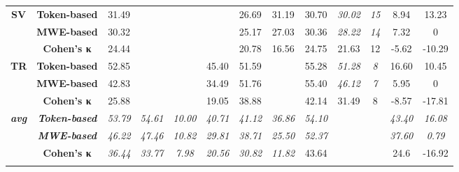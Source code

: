 \documentclass[output=paper,modfonts,nonflat,draftmode]{langsci/langscibook}
\begin{document}
\begin{table}
{\begin{tabular}{ccccccccccccc}
\textbf{\scriptsize{}SV} & \textbf{\scriptsize{}Token-based} & {\scriptsize{}31.49} &  &  &  & {\scriptsize{}26.69} & {\scriptsize{}31.19} & {\scriptsize{}30.70} & \emph{\scriptsize{}30.02} & \textit{\scriptsize{}15} & {\scriptsize{}8.94} & {\scriptsize{}13.23}\tabularnewline
 & \textbf{\scriptsize{}MWE-based} & {\scriptsize{}30.32} &  &  &  & {\scriptsize{}25.17} & {\scriptsize{}27.03} & {\scriptsize{}30.36} & \emph{\scriptsize{}28.22} & \textit{\scriptsize{}14} & {\scriptsize{}7.32} & {\scriptsize{}0}\tabularnewline
   & \textbf{\scriptsize{}Cohen's κ} &\scriptsize{24.44}  &\scriptsize{}  &\scriptsize{}  & \scriptsize{} &\scriptsize{20.78}  &\scriptsize{16.56}  &\scriptsize{24.75} &\scriptsize{21.63}  &\scriptsize{12} & \scriptsize{-5.62} &\scriptsize{-10.29}  \tabularnewline
\midrule 

\textbf{\scriptsize{}TR} & \textbf{\scriptsize{}Token-based} & {\scriptsize{}52.85} &  &  & {\scriptsize{}45.40} & {\scriptsize{}51.59} &  & {\scriptsize{}55.28} & \emph{\scriptsize{}51.28} & \textit{\scriptsize{}8} & {\scriptsize{}16.60} & {\scriptsize{}10.45}\tabularnewline
 & \textbf{\scriptsize{}MWE-based} & {\scriptsize{}42.83} &  &  & {\scriptsize{}34.49} & {\scriptsize{}51.76} &  & {\scriptsize{}55.40} & \emph{\scriptsize{}46.12} & \textit{\scriptsize{}7} & {\scriptsize{}5.95} & {\scriptsize{}0}\tabularnewline
   & \textbf{\scriptsize{}Cohen's κ} &\scriptsize{25.88}  &\scriptsize{}  &\scriptsize{}  & \scriptsize{19.05} &\scriptsize{38.88}  &\scriptsize{}  &\scriptsize{42.14} &\scriptsize{31.49}  &\scriptsize{8} & \scriptsize{-8.57}&\scriptsize{-17.81}  \tabularnewline
\midrule 

\textbf{\emph{\scriptsize{}avg}} & \textbf{\emph{\scriptsize{}Token-based}} & \emph{\scriptsize{}53.79} & \emph{\scriptsize{}54.61} & \emph{\scriptsize{}10.00} & \emph{\scriptsize{}40.71} & \emph{\scriptsize{}41.12} & \emph{\scriptsize{}36.86} & \emph{\scriptsize{}54.10} &  &  & \textit{\scriptsize{}43.40} & \textit{\scriptsize{}16.08}\tabularnewline
 & \textbf{\emph{\scriptsize{}MWE-based}} & \emph{\scriptsize{}46.22} & \emph{\scriptsize{}47.46} & \emph{\scriptsize{}10.82} & \emph{\scriptsize{}29.81} & \emph{\scriptsize{}38.71} & \emph{\scriptsize{}25.50} & \emph{\scriptsize{}52.37} &  &  & \textit{\scriptsize{}37.60} & \textit{\scriptsize{}0.79}\tabularnewline
   & \textbf{\scriptsize{}Cohen's κ} & \emph{\scriptsize{36.44} } & \emph{\scriptsize{33.77} } & \emph{\scriptsize{7.98}}  & \emph{ \scriptsize{20.56}} & \emph{\scriptsize{30.82} } & \emph{\scriptsize{11.82}}  &\scriptsize{43.64} &\scriptsize{}  &\scriptsize{} & \scriptsize{24.6} &\scriptsize{-16.92} \tabularnewline
\lspbottomrule

\end{tabular}{\scriptsize \par}

}

\end{table}
\end{document}
